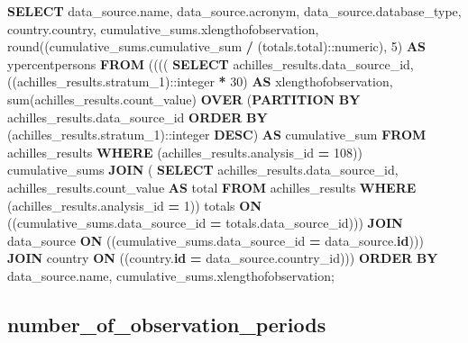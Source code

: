 \documentclass[
]{book}
\newenvironment{Shaded}{\begin{snugshade}}{\end{snugshade}}
\newcommand{\CharTok}[1]{\textcolor[rgb]{0.31,0.60,0.02}{#1}}
\newcommand{\DecValTok}[1]{\textcolor[rgb]{0.00,0.00,0.81}{#1}}
\newcommand{\FunctionTok}[1]{\textcolor[rgb]{0.00,0.00,0.00}{#1}}
\newcommand{\KeywordTok}[1]{\textcolor[rgb]{0.13,0.29,0.53}{\textbf{#1}}}
\newcommand{\NormalTok}[1]{#1}
\newcommand{\OperatorTok}[1]{\textcolor[rgb]{0.81,0.36,0.00}{\textbf{#1}}}
\begin{document}
\begin{Shaded}
\begin{Highlighting}[]
\KeywordTok{SELECT}\NormalTok{ data\_source.name,}
\NormalTok{   data\_source.acronym,}
\NormalTok{   data\_source.database\_type,}
\NormalTok{   country.country,}
\NormalTok{   cumulative\_sums.xlengthofobservation,}
   \FunctionTok{round}\NormalTok{((cumulative\_sums.cumulative\_sum }\OperatorTok{/}\NormalTok{ (totals.total):}\CharTok{:numeric}\NormalTok{), }\DecValTok{5}\NormalTok{) }\KeywordTok{AS}\NormalTok{ ypercentpersons}
  \KeywordTok{FROM}\NormalTok{ (((( }\KeywordTok{SELECT}\NormalTok{ achilles\_results.data\_source\_id,}
\NormalTok{           ((achilles\_results.stratum\_1):}\CharTok{:integer} \OperatorTok{*} \DecValTok{30}\NormalTok{) }\KeywordTok{AS}\NormalTok{ xlengthofobservation,}
           \FunctionTok{sum}\NormalTok{(achilles\_results.count\_value) }\KeywordTok{OVER}\NormalTok{ (}\KeywordTok{PARTITION} \KeywordTok{BY}\NormalTok{ achilles\_results.data\_source\_id }\KeywordTok{ORDER} \KeywordTok{BY}\NormalTok{ (achilles\_results.stratum\_1):}\CharTok{:integer} \KeywordTok{DESC}\NormalTok{) }\KeywordTok{AS}\NormalTok{ cumulative\_sum}
          \KeywordTok{FROM}\NormalTok{ achilles\_results}
         \KeywordTok{WHERE}\NormalTok{ (achilles\_results.analysis\_id }\OperatorTok{=} \DecValTok{108}\NormalTok{)) cumulative\_sums}
    \KeywordTok{JOIN}\NormalTok{ ( }\KeywordTok{SELECT}\NormalTok{ achilles\_results.data\_source\_id,}
\NormalTok{           achilles\_results.count\_value }\KeywordTok{AS}\NormalTok{ total}
          \KeywordTok{FROM}\NormalTok{ achilles\_results}
         \KeywordTok{WHERE}\NormalTok{ (achilles\_results.analysis\_id }\OperatorTok{=} \DecValTok{1}\NormalTok{)) totals }\KeywordTok{ON}\NormalTok{ ((cumulative\_sums.data\_source\_id }\OperatorTok{=}\NormalTok{ totals.data\_source\_id)))}
    \KeywordTok{JOIN}\NormalTok{ data\_source }\KeywordTok{ON}\NormalTok{ ((cumulative\_sums.data\_source\_id }\OperatorTok{=}\NormalTok{ data\_source.}\KeywordTok{id}\NormalTok{)))}
    \KeywordTok{JOIN}\NormalTok{ country }\KeywordTok{ON}\NormalTok{ ((country.}\KeywordTok{id} \OperatorTok{=}\NormalTok{ data\_source.country\_id)))}
 \KeywordTok{ORDER} \KeywordTok{BY}\NormalTok{ data\_source.name, cumulative\_sums.xlengthofobservation;}
\end{Highlighting}
\end{Shaded}

\hypertarget{number_of_observation_periods}{%
\subsection*{number\_of\_observation\_periods}\label{number_of_observation_periods}}
\end{document}
